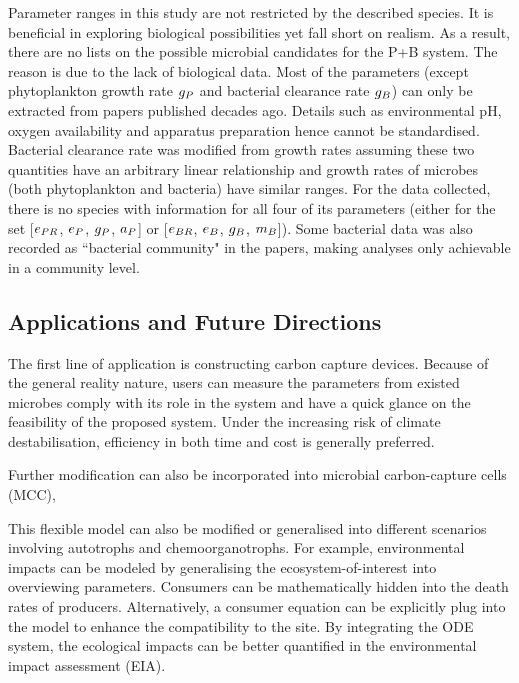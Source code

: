 \documentclass[../thesis.tex]{subfiles} %
\begin{document}
Parameter ranges in this study are not restricted by the described species.  It is beneficial in exploring biological possibilities yet fall short on realism.  As a result, there are no lists on the possible microbial candidates for the P+B system.  The reason is due to the lack of biological data.  Most of the parameters (except phytoplankton growth rate $g_P$ and bacterial clearance rate $g_B$) can only be extracted from papers published decades ago.  Details such as environmental pH, oxygen availability and apparatus preparation hence cannot be standardised.  Bacterial clearance rate was modified from growth rates assuming these two quantities have an arbitrary linear relationship and growth rates of microbes (both phytoplankton and bacteria) have similar ranges.  For the data collected, there is no species with information for all four of its parameters (either for the set [$e_{PR}$, $e_P$, $g_P$, $a_P$] or [$e_{BR}$, $e_B$, $g_B$, $m_B$]).  Some bacterial data was also recorded as ``bacterial community" in the papers,\autocite{cochran1988estimation} making analyses only achievable in a community level.

\subsection{Applications and Future Directions}
The first line of application is constructing carbon capture devices.  Because of the general reality nature, users can measure the parameters from existed microbes comply with its role in the system and have a quick glance on the feasibility of the proposed system.  Under the increasing risk of climate destabilisation,\autocite{notz2016observed,schuur2015climate} efficiency in both time and cost is generally preferred.

Further modification can also be incorporated into microbial carbon-capture cells (MCC),\autocite{neethu2018enhancement,pandit2012microbial}

This flexible model can also be modified or generalised into different scenarios involving autotrophs and chemoorganotrophs.  For example, environmental impacts can be modeled by generalising the ecosystem-of-interest into overviewing parameters.  Consumers can be mathematically hidden into the death rates of producers.  Alternatively, a consumer equation can be explicitly plug into the model to enhance the compatibility to the site.  By integrating the ODE system, the ecological impacts can be better quantified in the environmental impact assessment (EIA).
\end{document}
